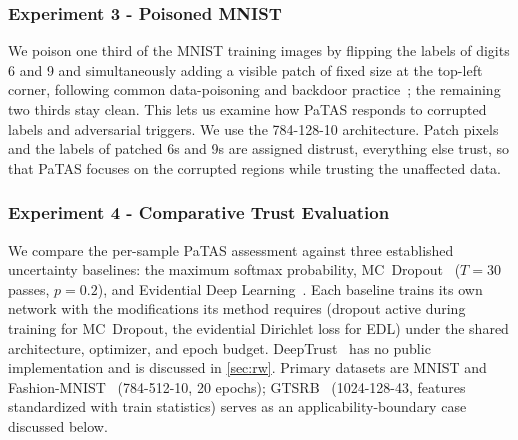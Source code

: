 \subsubsection{Experiment 3 - Poisoned MNIST}\label{exp:3}
We poison one third of the MNIST training images by flipping the labels of digits 6 and 9 and simultaneously adding a visible patch of fixed size at the top-left corner, following common data-poisoning and backdoor practice~\cite{chen2017targetedbackdoorattacksdeep}; the remaining two thirds stay clean. This lets us examine how PaTAS responds to corrupted labels and adversarial triggers. We use the 784-128-10 architecture. Patch pixels and the labels of patched 6s and 9s are assigned distrust, everything else trust, so that PaTAS focuses on the corrupted regions while trusting the unaffected data.


\subsubsection{Experiment 4 - Comparative Trust Evaluation}\label{exp:4}
We compare the per-sample PaTAS assessment against three established uncertainty baselines: the maximum softmax probability, MC~Dropout~\cite{gal2016dropoutbayesianapproximationrepresenting} ($T{=}30$ passes, $p{=}0.2$), and Evidential Deep Learning~\cite{sensoy2018evidentialdeeplearningquantify}. Each baseline trains its own network with the modifications its method requires (dropout active during training for MC~Dropout, the evidential Dirichlet loss for EDL) under the shared architecture, optimizer, and epoch budget. DeepTrust~\cite{10.3389/frai.2020.00054} has no public implementation and is discussed in \cref{sec:rw}. Primary datasets are MNIST and Fashion-MNIST~\cite{xiao2017fashionmnist} (784-512-10, 20 epochs); GTSRB~\cite{GTSRB} (1024-128-43, features standardized with train statistics) serves as an applicability-boundary case discussed below.

